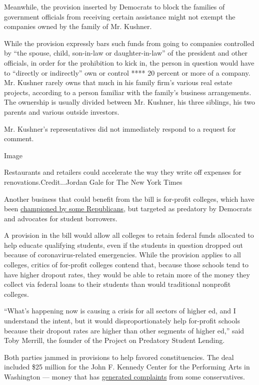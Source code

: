 Meanwhile, the provision inserted by Democrats to block the families of
government officials from receiving certain assistance might not exempt
the companies owned by the family of Mr. Kushner.

While the provision expressly bars such funds from going to companies
controlled by ``the spouse, child, son-in-law or daughter-in-law'' of
the president and other officials, in order for the prohibition to kick
in, the person in question would have to ``directly or indirectly'' own
or control **** 20 percent or more of a company. Mr. Kushner rarely owns
that much in his family firm's various real estate projects, according
to a person familiar with the family's business arrangements. The
ownership is usually divided between Mr. Kushner, his three siblings,
his two parents and various outside investors.

Mr. Kushner's representatives did not immediately respond to a request
for comment.

Image

Restaurants and retailers could accelerate the way they write off
expenses for renovations.Credit...Jordan Gale for The New York Times

Another business that could benefit from the bill is for-profit
colleges, which have been
\href{https://www.nytimes.com/2019/06/28/us/politics/betsy-devos-for-profit-colleges.html}{championed
by some Republicans}, but targeted as predatory by Democrats and
advocates for student borrowers.

A provision in the bill would allow all colleges to retain federal funds
allocated to help educate qualifying students, even if the students in
question dropped out because of coronavirus-related emergencies. While
the provision applies to all colleges, critics of for-profit colleges
contend that, because those schools tend to have higher dropout rates,
they would be able to retain more of the money they collect via federal
loans to their students than would traditional nonprofit colleges.

``What's happening now is causing a crisis for all sectors of higher ed,
and I understand the intent, but it would disproportionately help
for-profit schools because their dropout rates are higher than other
segments of higher ed,'' said Toby Merrill, the founder of the Project
on Predatory Student Lending.

Both parties jammed in provisions to help favored constituencies. The
deal included \$25 million for the John F. Kennedy Center for the
Performing Arts in Washington --- money that has
\href{https://www.foxnews.com/media/dana-perino-democrats-coronavirus-bill-kennedy-center}{generated
complaints} from some conservatives.

